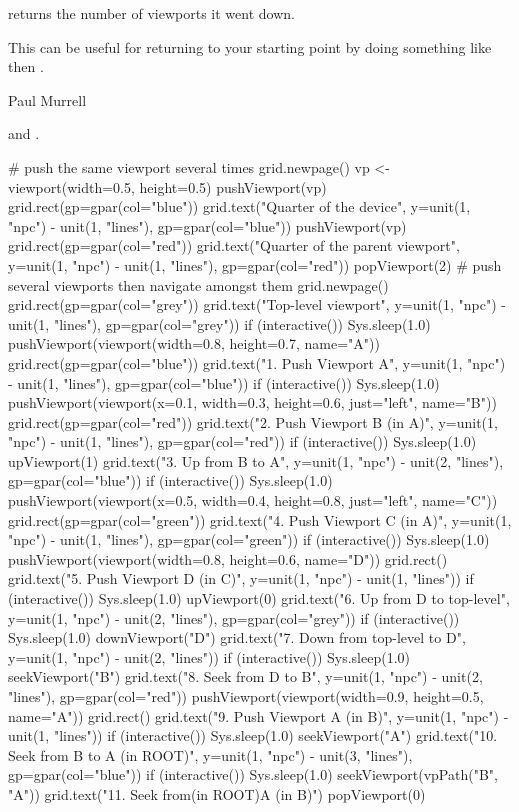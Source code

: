 %
\begin{Value}
 returns the number of viewports it went down.

This can be useful for returning to your starting point by doing
something like  then
.
\end{Value}
%
\begin{Author}\relax
Paul Murrell
\end{Author}
%
\begin{SeeAlso}\relax
{} and .
\end{SeeAlso}
%
\begin{Examples}
\begin{ExampleCode}
# push the same viewport several times
grid.newpage()
vp <- viewport(width=0.5, height=0.5)
pushViewport(vp)
grid.rect(gp=gpar(col="blue"))
grid.text("Quarter of the device",
  y=unit(1, "npc") - unit(1, "lines"), gp=gpar(col="blue"))
pushViewport(vp)
grid.rect(gp=gpar(col="red"))
grid.text("Quarter of the parent viewport",
  y=unit(1, "npc") - unit(1, "lines"), gp=gpar(col="red"))
popViewport(2)
# push several viewports then navigate amongst them
grid.newpage()
grid.rect(gp=gpar(col="grey"))
grid.text("Top-level viewport",
  y=unit(1, "npc") - unit(1, "lines"), gp=gpar(col="grey"))
if (interactive()) Sys.sleep(1.0)
pushViewport(viewport(width=0.8, height=0.7, name="A"))
grid.rect(gp=gpar(col="blue"))
grid.text("1. Push Viewport A",
  y=unit(1, "npc") - unit(1, "lines"), gp=gpar(col="blue"))
if (interactive()) Sys.sleep(1.0)
pushViewport(viewport(x=0.1, width=0.3, height=0.6,
  just="left", name="B"))
grid.rect(gp=gpar(col="red"))
grid.text("2. Push Viewport B (in A)",
  y=unit(1, "npc") - unit(1, "lines"), gp=gpar(col="red"))
if (interactive()) Sys.sleep(1.0)
upViewport(1)
grid.text("3. Up from B to A",
  y=unit(1, "npc") - unit(2, "lines"), gp=gpar(col="blue"))
if (interactive()) Sys.sleep(1.0)
pushViewport(viewport(x=0.5, width=0.4, height=0.8,
  just="left", name="C"))
grid.rect(gp=gpar(col="green"))
grid.text("4. Push Viewport C (in A)",
  y=unit(1, "npc") - unit(1, "lines"), gp=gpar(col="green"))
if (interactive()) Sys.sleep(1.0)
pushViewport(viewport(width=0.8, height=0.6, name="D"))
grid.rect()
grid.text("5. Push Viewport D (in C)",
  y=unit(1, "npc") - unit(1, "lines"))
if (interactive()) Sys.sleep(1.0)
upViewport(0)
grid.text("6. Up from D to top-level",
  y=unit(1, "npc") - unit(2, "lines"), gp=gpar(col="grey"))
if (interactive()) Sys.sleep(1.0)
downViewport("D")
grid.text("7. Down from top-level to D",
  y=unit(1, "npc") - unit(2, "lines"))
if (interactive()) Sys.sleep(1.0)
seekViewport("B")
grid.text("8. Seek from D to B",
  y=unit(1, "npc") - unit(2, "lines"), gp=gpar(col="red"))
pushViewport(viewport(width=0.9, height=0.5, name="A"))
grid.rect()
grid.text("9. Push Viewport A (in B)",
  y=unit(1, "npc") - unit(1, "lines"))
if (interactive()) Sys.sleep(1.0)
seekViewport("A")
grid.text("10. Seek from B to A (in ROOT)",
  y=unit(1, "npc") - unit(3, "lines"), gp=gpar(col="blue"))
if (interactive()) Sys.sleep(1.0)
seekViewport(vpPath("B", "A"))
grid.text("11. Seek from\nA (in ROOT)\nto A (in B)")
popViewport(0)
\end{ExampleCode}
\end{Examples}
